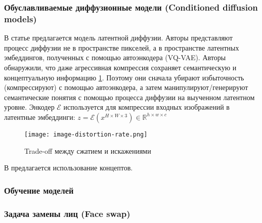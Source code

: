 





\par



\subsubsection{Обуславливаемые диффузионные модели (Conditioned diffusion models)}
\par

В статье \cite{rombach2022highresolution} предлагается модель латентной диффузии. Авторы представляют процесс диффузии не в пространстве пикселей, а в пространстве латентных эмбеддингов, полученных с помощью автоэнкодера (VQ-VAE). Авторы обнаружили, что даже агрессивная компрессия сохраняет семантическую и концептуальную информацию \ref{fig:image-distortion-rate}. Поэтому они сначала убирают избыточность (компрессируют) с помощью автоэнкодера, а затем манипулируют/генерируют семантические понятия с помощью процесса диффузии на выученном латентном уровне. Энкодер $\mathcal{E}$ используется для компрессии входных изображений в латентные эмбеддинги: $z = \mathcal{E}(x^{H\times W\times 3}) \in \mathbb{R}^{h\times w\times c}$
\begin{figure}[H]
    \centering
    \texttt{[image: image-distortion-rate.png]}
    \caption{Trade-off между сжатием и искажениями \cite{rombach2022highresolution}}
    \label{fig:image-distortion-rate}
\end{figure} 

В \cite{ruiz2023dreambooth} предлагается использование концептов. 




\subsubsection{Обучение моделей}
\par

\subsubsection{Задача замены лиц (Face swap)}

\par
